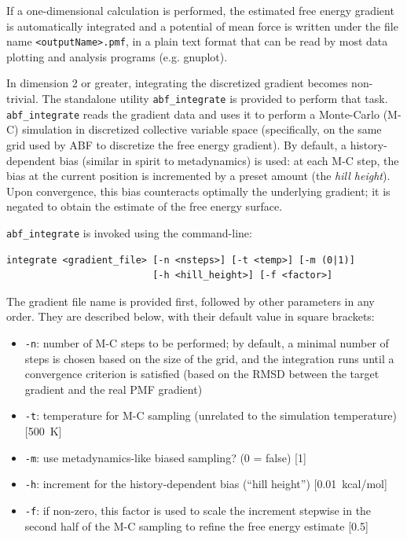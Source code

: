 If a one-dimensional calculation is performed, the estimated free energy
gradient is automatically integrated and a potential of mean force is written
under the file name \texttt{<outputName>.pmf}, in a plain text format that
can be read by most data plotting and analysis programs (e.g. gnuplot).

In dimension 2 or greater, integrating the discretized gradient becomes non-trivial. The
standalone utility \texttt{abf\_integrate} is provided to perform that task.
\texttt{abf\_integrate} reads the gradient data and uses it to perform a Monte-Carlo (M-C)
simulation in discretized collective variable space (specifically, on the same grid
used by ABF to discretize the free energy gradient).
By default, a history-dependent bias (similar in spirit to metadynamics) is used:
at each M-C step, the bias at the current position is incremented by a preset amount
(the \emph{hill height}).
Upon convergence, this bias counteracts optimally the underlying gradient;
it is negated to obtain the estimate of the free energy surface.

\texttt{abf\_integrate} is invoked using the command-line:
{\small
\begin{verbatim}
integrate <gradient_file> [-n <nsteps>] [-t <temp>] [-m (0|1)]
                          [-h <hill_height>] [-f <factor>]
\end{verbatim}
}

The gradient file name is provided first, followed by other parameters in any order.
They are described below, with their default value in square brackets:
\begin{itemize}
\setlength{\itemsep}{0pt}
\item \texttt{-n}: number of M-C steps to be performed; by default, a minimal number of
steps is chosen based on the size of the grid, and the integration runs until a convergence
criterion is satisfied (based on the RMSD between the target gradient and the real PMF gradient)
\item \texttt{-t}: temperature for M-C sampling (unrelated to the simulation temperature)
  [500~K]
\item \texttt{-m}: use metadynamics-like biased sampling? (0 = false) [1]
\item \texttt{-h}: increment for the history-dependent bias (``hill height'') [0.01~kcal/mol]
\item \texttt{-f}: if non-zero, this factor is used to scale the increment stepwise in the 
  second half of the M-C sampling to refine the free energy estimate [0.5]
\end{itemize}

